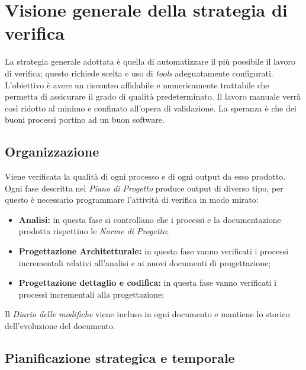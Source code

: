 \clearpage
\section{Visione generale della strategia di verifica}
La strategia generale adottata è quella di automatizzare il più possibile il lavoro di verifica; questo richiede scelta e uso di \emph{tools} adeguatamente configurati. L'obiettivo è avere un riscontro affidabile e numericamente trattabile che permetta di assicurare il grado di qualità predeterminato. Il lavoro manuale verrà così ridotto al minimo e confinato all'opera di validazione.
La speranza è che dei buoni processi portino ad un buon software.
	
	\subsection{Organizzazione}
	Viene verificata la qualità di ogni processo e di ogni output da esso prodotto. Ogni fase  descritta nel \emph{Piano di Progetto} produce output di diverso tipo, per questo è necessario programmare l'attività di verifica in modo mirato:

	\begin{itemize}
		\item \textbf{Analisi:} in questa fase si controllano che i processi e la documentazione prodotta rispettino le \emph{Norme di Progetto};
		\item \textbf{Progettazione Architetturale:} in questa fase vanno verificati i processi incrementali relativi all'analisi e ai nuovi documenti di progettazione;
		\item \textbf{Progettazione dettaglio e codifica:} in questa fase vanno verificati i processi incrementali alla progettazione;
	\end{itemize}
	
	Il \emph{Diario delle modifiche} viene incluso in ogni documento e mantiene lo storico dell'evoluzione del documento.
	
	\subsection{Pianificazione strategica e temporale}
